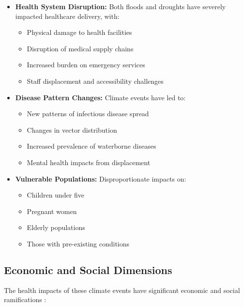 \begin{tcolorbox}[colback=white,colframe=gray!20,boxrule=0.5pt]
\begin{itemize}
    \item \textbf{Health System Disruption:} Both floods and droughts have severely impacted healthcare delivery, with:
    \begin{itemize}
        \item Physical damage to health facilities
        \item Disruption of medical supply chains
        \item Increased burden on emergency services
        \item Staff displacement and accessibility challenges
    \end{itemize}
    
    \item \textbf{Disease Pattern Changes:} Climate events have led to:
    \begin{itemize}
        \item New patterns of infectious disease spread
        \item Changes in vector distribution
        \item Increased prevalence of waterborne diseases
        \item Mental health impacts from displacement
    \end{itemize}
    
    \item \textbf{Vulnerable Populations:} Disproportionate impacts on:
    \begin{itemize}
        \item Children under five
        \item Pregnant women
        \item Elderly populations
        \item Those with pre-existing conditions
    \end{itemize}
\end{itemize}
\end{tcolorbox}

\subsection{Economic and Social Dimensions}

The health impacts of these climate events have significant economic and social ramifications \citep{unocha2024south}:

